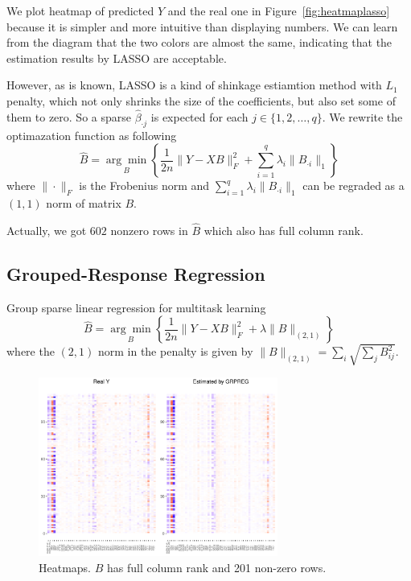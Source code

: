 We plot heatmap of predicted $Y$ and the real one in Figure~\ref{fig:heatmaplasso} because it is simpler and more intuitive than displaying numbers. 
We can learn from the diagram that the two colors are almost the same, indicating that the estimation results by LASSO are acceptable. 


However, as is known, LASSO is a kind of shinkage estiamtion method with $L_1$ penalty, which not only shrinks the size of the coefficients, but also set some of them to zero. 
So a sparse $\hat{\beta}_{\cdot j}$ is expected for each $j\in\{ 1,2,\dots,q \}$. 
We rewrite the optimazation function as following
\begin{equation}
    \widehat{B}=\underset{B}{\arg \min }\left\{\frac{1}{2n}\|Y-X B\|_{F}^{2} + \sum_{i=1}^q \lambda_i \|B_{\cdot i}\|_{1} \right\}
\end{equation}
where $\|\cdot\|_{F}$ is the Frobenius norm and $\sum_{i=1}^q \lambda_i \|B_{\cdot i}\|_{1}$ can be regraded as a $(1,1)$ norm of matrix $B$. 

Actually, we got $602$ nonzero rows in $\widehat{B}$ which also has full column rank. 



\subsection{Grouped-Response Regression}

Group sparse linear regression for multitask learning \citep{dai2016knockoff}
\begin{equation}
    \widehat{B}=\underset{B}{\arg \min }\left\{\frac{1}{2n}\|Y-X B\|_{F}^{2} + \lambda \|B\|_{(2,1)}\right\}
\end{equation}
where the $(2,1)$ norm in the penalty is given by
$\|B\|_{(2,1)} = \sum_i \sqrt{\sum_j B_{ij}^2}$.

\begin{figure}[ht]
    \centering
    \includegraphics[width=0.7\textwidth]{./figs/heatmap_grpreg.pdf}
    \caption{Heatmaps. $\widehat{B}$ has full column rank and 201 non-zero rows.}
    \label{fig:heatmapgroup}
\end{figure}

